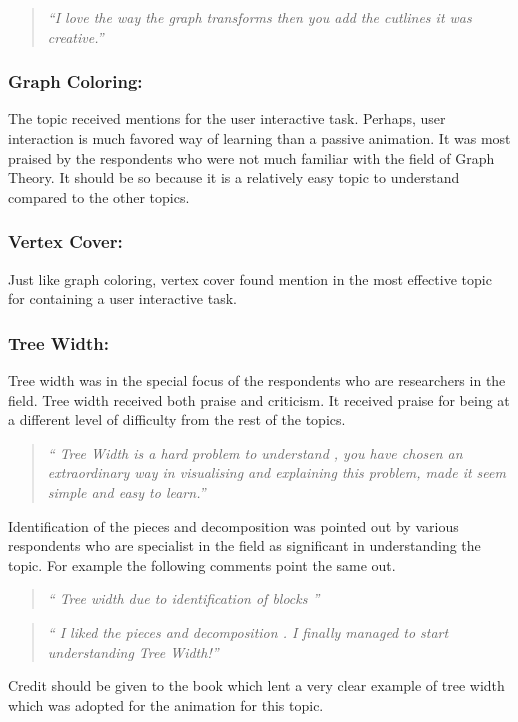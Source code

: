 \begin{quote}
\emph{``I love the way the graph transforms then you add the cutlines it was
creative.''}
\end{quote}

\subsubsection{Graph Coloring:}
The topic received mentions for the user interactive task. Perhaps, user
interaction is much favored way of learning than a passive animation.
It was most praised by the respondents who were not much familiar with
the field of Graph Theory. It should be so because it is a relatively easy
topic to understand compared to the other topics.

\subsubsection{Vertex Cover:}
Just like graph coloring, vertex cover found mention in the most effective topic for 
containing a user interactive task.

\subsubsection{Tree Width:}
Tree width was in the special focus of the respondents who are researchers in
the field.  Tree width received both praise and criticism. It received praise
for being at a different level of difficulty from the rest of the topics.
\begin{quote}
\emph{``
Tree Width is a hard problem to understand , you
have chosen an extraordinary way in visualising and explaining this
problem, made it seem simple and easy to learn.''}
\end{quote}

Identification of the pieces and decomposition was pointed out by various
respondents who are specialist in the field as significant in understanding the
topic. For example the following comments point the same out.

\begin{quote}
\emph{``
Tree width due to identification of blocks
''}
\end{quote}
\begin{quote}
\emph{``
I liked the pieces and decomposition .
I finally managed to start understanding Tree Width!''}
\end{quote}

Credit should be given to the book \cite{KleinbergTardos06} which lent a very
clear example of tree width which was adopted for the animation for this topic.

